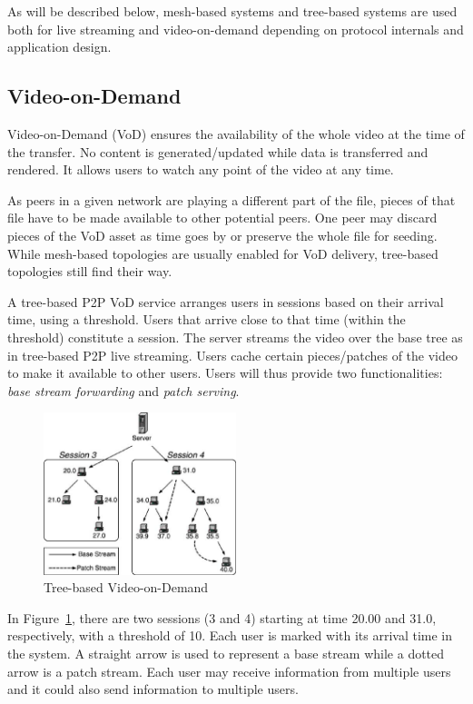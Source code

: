 As will be described below, mesh-based systems and tree-based systems are used
both for live streaming and video-on-demand depending on protocol internals
and application design.

\subsection{Video-on-Demand}
\label{subsec:p2p-systems:vod}

Video-on-Demand (VoD) ensures the availability of the whole video at the time
of the transfer. No content is generated/updated while data is transferred and
rendered. It allows users to watch any point of the video at any time.

As peers in a given network are playing a different part of the file, pieces
of that file have to be made available to other potential peers. One peer may
discard pieces of the VoD asset as time goes by or preserve the whole file for
seeding. While mesh-based topologies are usually enabled for VoD delivery,
tree-based topologies still find their way.

A tree-based P2P VoD service arranges users in sessions based on their arrival
time, using a threshold. Users that arrive close to that time (within the
threshold) constitute a session. The server streams the video over the base
tree as in tree-based P2P live streaming. Users cache certain pieces/patches
of the video to make it available to other users. Users will thus provide two
functionalities: \textit{base stream forwarding} and \textit{patch serving}.

\begin{figure}
  \centering
  \includegraphics[width=0.5\textwidth]{src/img/p2p-systems/tree-based-vod}
  \caption{Tree-based Video-on-Demand~\cite{p2p-streaming-survey}}
  \label{fig:p2p-systems:tree-based-vod}
\end{figure}

In Figure~\ref{fig:p2p-systems:tree-based-vod}, there are two sessions (3 and 4) starting
at time 20.00 and
31.0, respectively, with a threshold of 10. Each user is marked with its
arrival time in the system. A straight arrow is used to represent a base
stream while a dotted arrow is a patch stream. Each user may receive
information from multiple users and it could also send information to multiple
users.


